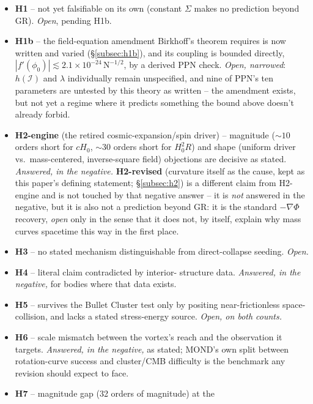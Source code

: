\documentclass[12pt, a4paper]{article}
\begin{document}
\begin{itemize}
  \item \textbf{H1} -- not yet falsifiable on its own (constant
    $\Sigma$ makes no prediction beyond GR). \emph{Open}, pending H1b.
  \item \textbf{H1b} -- the field-equation amendment Birkhoff's
    theorem requires is now written and varied (\S\ref{subsec:h1b}),
    and its coupling is bounded directly,
    $|f'(\phi_0)|\lesssim2.1\times10^{-24}\,\mathrm{N}^{-1/2}$, by a
    derived PPN check. \emph{Open, narrowed}: $h(\mathcal{I})$ and
    $\lambda$ individually remain unspecified, and nine of PPN's ten
    parameters are untested by this theory as written -- the
    amendment exists, but not yet a regime where it predicts
    something the bound above doesn't already forbid.
  \item \textbf{H2-engine} (the retired cosmic-expansion/spin driver)
    -- magnitude ($\sim10$ orders short for $cH_0$, $\sim30$ orders
    short for $H_0^2R$) and shape (uniform driver vs.\
    mass-centered, inverse-square field) objections are decisive as
    stated. \emph{Answered, in the negative.} \textbf{H2-revised}
    (curvature itself as the cause, kept as this paper's defining
    statement; \S\ref{subsec:h2}) is a different claim from
    H2-engine and is not touched by that negative answer -- it is
    \emph{not} answered in the negative, but it is also not a
    prediction beyond GR: it is the standard $-\nabla\Phi$ recovery,
    \emph{open} only in the sense that it does not, by itself,
    explain why mass curves spacetime this way in the first place.
  \item \textbf{H3} -- no stated mechanism distinguishable from
    direct-collapse seeding. \emph{Open.}
  \item \textbf{H4} -- literal claim contradicted by interior-
    structure data. \emph{Answered, in the negative,} for bodies
    where that data exists.
  \item \textbf{H5} -- survives the Bullet Cluster test only by
    positing near-frictionless space-collision, and lacks a stated
    stress-energy source. \emph{Open, on both counts.}
  \item \textbf{H6} -- scale mismatch between the vortex's reach and
    the observation it targets. \emph{Answered, in the negative,} as
    stated; MOND's own split between rotation-curve success and
    cluster/CMB difficulty is the benchmark any revision should expect
    to face.
  \item \textbf{H7} -- magnitude gap (32 orders of magnitude) at the

\end{itemize}
\end{document}
